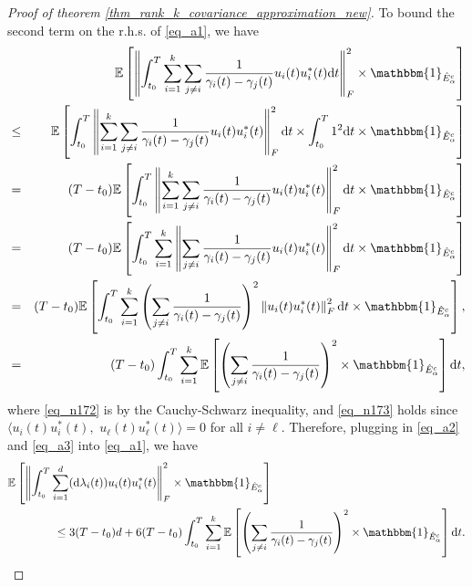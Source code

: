 \documentclass[11pt,letterpaper]{article}
\begin{document}
\begin{proof}[Proof of theorem \ref{thm_rank_k_covariance_approximation_new}]
To bound the second term on the r.h.s. of \eqref{eq_a1}, we have
%
\begin{eqnarray}\label{eq_a3}
    & &  \!\!\!\!\!\!\!\! \! \!\! \! \!\!\!\!\!\!\!\!\!\!\!\!\!\!\!\! \! \!\! \! \!\!\!\!\!\!\!\!\!\!\!\!\!\!\!\! \! \!\mathbb{E}\left[\left\|\int_{t_0}^T \sum_{i=1}^k \sum_{j \neq i} \frac{1}{\gamma_i(t) - \gamma_j(t)}  u_i(t) u_i^\ast(t) \mathrm{d}t\right\|_F^2 \times \mathbbm{1}_{\hat{E}_\alpha^c} \right]\nonumber\\
    &\leq  &   \mathbb{E}\left[\int_{t_0}^T \left\|\sum_{i=1}^k \sum_{j \neq i} \frac{1}{\gamma_i(t) - \gamma_j(t)}  u_i(t) u_i^\ast(t) \right\|_F^2 \mathrm{d}t \times \int_{t_0}^T 1^2 \mathrm{d}t \times \mathbbm{1}_{\hat{E}_\alpha^c} \right] \label{eq_n172}\\
       &= &   (T-t_0)\mathbb{E}\left[\int_{t_0}^T \left\|\sum_{i=1}^k \sum_{j \neq i} \frac{1}{\gamma_i(t) - \gamma_j(t)}  u_i(t) u_i^\ast(t) \right\|_F^2 \mathrm{d}t \times \mathbbm{1}_{\hat{E}_\alpha^c} \right]\nonumber\\
             &= &   (T-t_0)\mathbb{E}\left[\int_{t_0}^T \sum_{i=1}^k \left\| \sum_{j \neq i} \frac{1}{\gamma_i(t) - \gamma_j(t)}  u_i(t) u_i^\ast(t) \right\|_F^2 \mathrm{d}t \times \mathbbm{1}_{\hat{E}_\alpha^c} \right]\label{eq_n173}\\
                          &=&    (T-t_0)\mathbb{E}\left[\int_{t_0}^T \sum_{i=1}^k  \left(\sum_{j \neq i} \frac{1}{\gamma_i(t) - \gamma_j(t)}\right)^2 \left\| u_i(t) u_i^\ast(t) \right\|_F^2 \mathrm{d}t \times \mathbbm{1}_{\hat{E}_\alpha^c} \right],\nonumber\\
                            &=&    (T-t_0)\int_{t_0}^T \sum_{i=1}^k\mathbb{E}\left[  \left(\sum_{j \neq i} \frac{1}{\gamma_i(t) - \gamma_j(t)}\right)^2 \times \mathbbm{1}_{\hat{E}_\alpha^c} \right] \mathrm{d}t,
\end{eqnarray}
%
where \eqref{eq_n172} is by the Cauchy-Schwarz inequality,
%
and \eqref{eq_n173} holds since $\langle u_i(t) u_i^\ast(t), \, \, u_\ell(t) u_\ell^\ast(t) \rangle = 0$ for all $i \neq \ell$.
%
Therefore, plugging in \eqref{eq_a2} and \eqref{eq_a3} into \eqref{eq_a1}, we have
%
 \begin{align}\label{eq_a4}
    &\mathbb{E}\left[\left\|\int_{t_0}^T \sum_{i=1}^d (\mathrm{d} \lambda_i(t))  u_i(t) u_i^\ast(t)\right\|_F^2 \times \mathbbm{1}_{\hat{E}_\alpha^c} \right]\nonumber \\
    & \qquad \qquad \leq 3(T-t_0) d +  6 (T-t_0)\int_{t_0}^T \sum_{i=1}^k\mathbb{E}\left[  \left(\sum_{j \neq i} \frac{1}{\gamma_i(t) - \gamma_j(t)}\right)^2 \times \mathbbm{1}_{\hat{E}_\alpha^c} \right] \mathrm{d}t.
 \end{align}


\end{proof}
\end{document}
